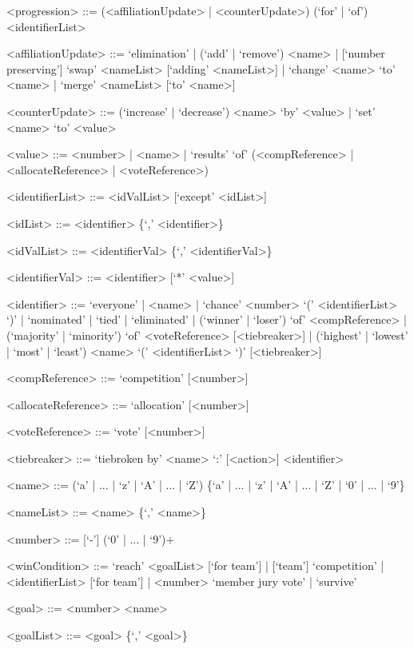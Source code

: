 \documentclass{article}
\begin{document}
\begin{grammar}
<progression> ::= (<affiliationUpdate> | <counterUpdate>) (`for' | `of') 
<identifierList>

<affiliationUpdate> ::= `elimination' | (`add' | `remove') <name> | 
[`number preserving'] `swap' <nameList> [`adding' <nameList>] | `change' <name> 
`to' <name> | `merge' <nameList> [`to' <name>]

<counterUpdate> ::= (`increase' | `decrease') <name> `by' <value> | `set' 
<name> `to' <value> 

<value> ::= <number> | <name> | `results' `of' (<compReference> | 
<allocateReference> |
<voteReference>) %

<identifierList> ::= <idValList> [`except' <idList>]

<idList> ::= <identifier> \{`,' <identifier>\}

<idValList> ::= <identifierVal> \{`,' <identifierVal>\}

<identifierVal> ::= <identifier> [`*' <value>]

<identifier> ::= `everyone' | <name> | `chance'  <number> `(' <identifierList> 
`)' | 
`nominated' 
| 
`tied' | 
`eliminated' | (`winner' | `loser') `of' <compReference> | (`majority' | 
`minority') `of' <voteReference>  [<tiebreaker>] | (`highest' | `lowest' | 
`most' | `least') <name> `(' <identifierList> `)' [<tiebreaker>]

<compReference> ::= `competition' [<number>] 

<allocateReference> ::= `allocation' [<number>]

<voteReference> ::= `vote' [<number>]

<tiebreaker> ::= `tiebroken by' <name> `:' [<action>] <identifier>

<name> ::= (`a' | ... | `z' | `A' | ... | `Z') \{`a' | ... | `z' | `A' | ... | 
`Z' | `0' | ... | `9'\}

<nameList> ::= <name> \{`,' <name>\}

<number> ::= [`-'] (`0' | ... | `9')+

<winCondition> ::= `reach' <goalList> [`for team']  | [`team'] 
`competition' | <identifierList> [`for team'] | 
<number> `member jury vote' | `survive'

<goal> ::= <number> <name>

<goalList> ::= <goal> \{`,' <goal>\}

\end{grammar}
\end{document}

